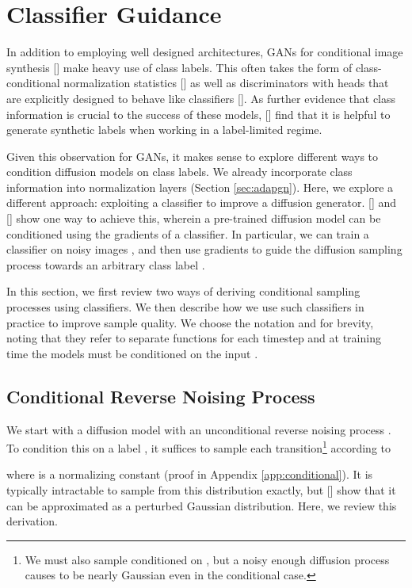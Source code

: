 \documentclass{article}
\newcommand{\shortcite}[1]{[\citenum{#1}]}
\newcommand{\namecite}[1]{\citeauthor{#1} [\citenum{#1}]}
\begin{document}
\section{Classifier Guidance}
\label{sec:guidance}

In addition to employing well designed architectures, GANs for conditional image synthesis \shortcite{cgan,biggan} make heavy use of class labels. This often takes the form of class-conditional normalization statistics \shortcite{cganbn,cganmodulat} as well as discriminators with heads that are explicitly designed to behave like classifiers  \shortcite{cganproj}. As further evidence that class information is crucial to the success of these models, \namecite{unlabeledgan} find that it is helpful to generate synthetic labels when working in a label-limited regime.

Given this observation for GANs, it makes sense to explore different ways to condition diffusion models on class labels. We already incorporate class information into normalization layers (Section \ref{sec:adapgn}). Here, we explore a different approach: exploiting a classifier  to improve a diffusion generator. \namecite{dickstein} and \namecite{sde} show one way to achieve this, wherein a pre-trained diffusion model can be conditioned using the gradients of a classifier. In particular, we can train a classifier  on noisy images , and then use gradients  to guide the diffusion sampling process towards an arbitrary class label .

In this section, we first review two ways of deriving conditional sampling processes using classifiers. We then describe how we use such classifiers in practice to improve sample quality. We choose the notation  and  for brevity, noting that they refer to separate functions for each timestep  and at training time the models must be conditioned on the input . 

\subsection{Conditional Reverse Noising Process}

We start with a diffusion model with an unconditional reverse noising process . To condition this on a label , it suffices to sample each transition\footnote{We must also sample  conditioned on , but a noisy enough diffusion process causes  to be nearly Gaussian even in the conditional case.} according to


where  is a normalizing constant (proof in Appendix \ref{app:conditional}). It is typically intractable to sample from this distribution exactly, but \namecite{dickstein} show that it can be approximated as a perturbed Gaussian distribution. Here, we review this derivation.
\end{document}

